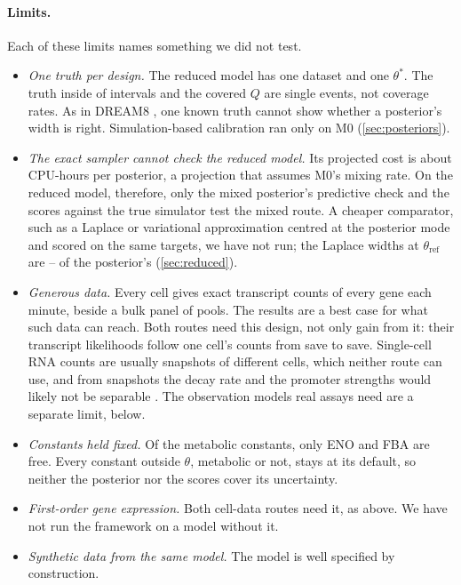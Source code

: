 \paragraph{Limits.} Each of these limits names something we did not test.
\begin{itemize}
  \item \emph{One truth per design.} The reduced model has one dataset and one $\theta^\ast$.
  The truth inside  of  intervals and the covered $Q$ are single
  events, not coverage rates. As in DREAM8 \cite{karr2015summary}, one known truth cannot show
  whether a posterior's width is right. Simulation-based calibration ran only on M0
  (\cref{sec:posteriors}).
  \item \emph{The exact sampler cannot check the reduced model.} Its projected cost is about
   CPU-hours per posterior, a projection that assumes M0's mixing rate. On the
  reduced model, therefore, only the mixed posterior's predictive check and the scores against
  the true simulator test the mixed route. A cheaper comparator, such as a Laplace or variational
  approximation centred at the posterior mode and scored on the same targets, we have not run;
  the Laplace widths at $\theta_{\mathrm{ref}}$ are -- of the
  posterior's (\cref{sec:reduced}).
  \item \emph{Generous data.} Every cell gives exact transcript counts of every gene each
  minute, beside a bulk panel of  pools. The results are a best case for what
  such data can reach. Both routes need this design, not only gain from it: their transcript
  likelihoods follow one cell's counts from save to save. Single-cell RNA counts are usually
  snapshots of different cells, which neither route can use, and from snapshots the decay
  rate and the promoter strengths would likely not be separable \cite{karr2015summary}. The
  observation models real assays need are a separate limit, below.
  \item \emph{Constants held fixed.} Of the metabolic constants, only ENO and FBA are free.
  Every constant outside $\theta$, metabolic or not, stays at its default, so neither the
  posterior nor the scores cover its uncertainty.
  \item \emph{First-order gene expression.} Both cell-data routes need it, as above. We have not
  run the framework on a model without it.
  \item \emph{Synthetic data from the same model.} The model is well specified by construction.

\end{itemize}
